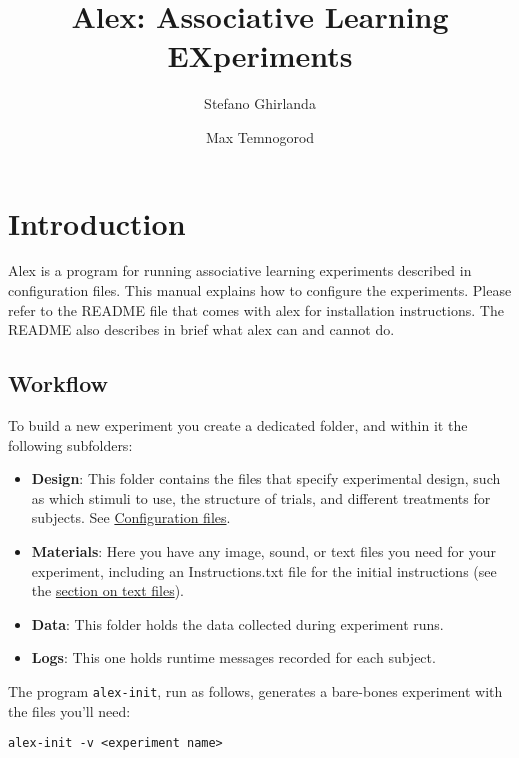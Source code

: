 \documentclass[11pt,]{article}
\title{Alex: Associative Learning EXperiments}
\author{Stefano Ghirlanda \and Max Temnogorod}
\date{}
\begin{document}
\maketitle

{
\hypersetup{linkcolor=black}
\setcounter{tocdepth}{3}
\begin{spacing}{0}
\small
\tableofcontents
\end{spacing}
\clearpage
}
\section{Introduction}\label{intro}

Alex is a program for running associative learning experiments described
in configuration files. This manual explains how to configure the
experiments. Please refer to the README file that comes with alex for
installation instructions. The README also describes in brief what alex
can and cannot do.

\subsection{Workflow}\label{workflow}

To build a new experiment you create a dedicated folder, and within it
the following subfolders:

\begin{itemize}
\item
  \textbf{Design}: This folder contains the files that specify
  experimental design, such as which stimuli to use, the structure of
  trials, and different treatments for subjects. See
  \hyperref[configuration-files]{Configuration files}.
\item
  \textbf{Materials}: Here you have any image, sound, or text files you
  need for your experiment, including an Instructions.txt file for the
  initial instructions (see the \hyperref[textfiles]{section on text
  files}).
\item
  \textbf{Data}: This folder holds the data collected during experiment
  runs.
\item
  \textbf{Logs}: This one holds runtime messages recorded for each
  subject.
\end{itemize}

The program \texttt{alex-init}, run as follows, generates a bare-bones
experiment with the files you'll need:

\begin{verbatim}
alex-init -v <experiment name>
\end{verbatim}
\end{document}
